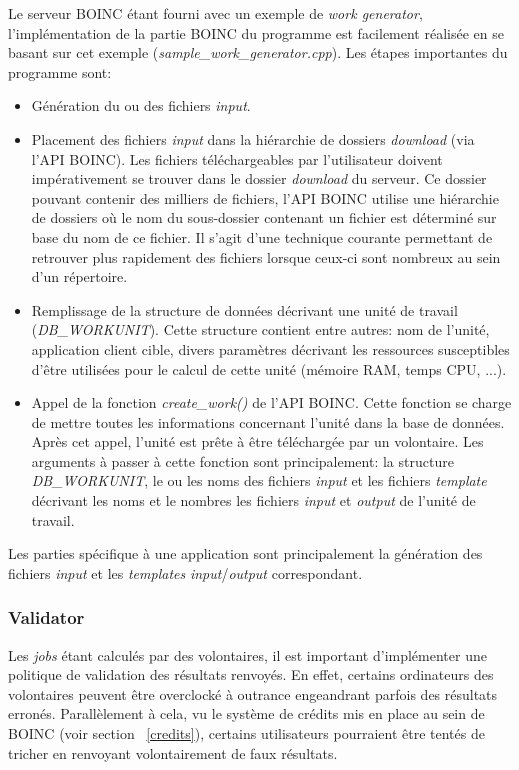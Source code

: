 \documentclass[a4paper, 11pt]{report}
\begin{document}
Le serveur \textsc{BOINC} étant fourni avec un exemple de \textit{work generator}, l'implémentation de la partie \textsc{BOINC} du programme est facilement réalisée en se basant sur cet exemple (\textit{sample\_work\_generator.cpp}). Les étapes importantes du programme sont:
\begin{itemize}
\item Génération du ou des fichiers \textit{input}.
\item Placement des fichiers \textit{input} dans la hiérarchie de dossiers \textit{download} (via l'API \textsc{BOINC}). Les fichiers téléchargeables par l'utilisateur doivent impérativement se trouver dans le dossier \textit{download} du serveur. Ce dossier pouvant contenir des milliers de fichiers, l'API \textsc{BOINC} utilise une hiérarchie de dossiers où le nom du sous-dossier contenant un fichier est déterminé sur base du nom de ce fichier. Il s'agit d'une technique courante permettant de retrouver plus rapidement des fichiers lorsque ceux-ci sont nombreux au sein d'un répertoire.
\item Remplissage de la structure de données décrivant une unité de travail (\textit{DB\_WORKUNIT}). Cette structure contient entre autres: nom de l'unité, application client cible, divers paramètres décrivant les ressources susceptibles d'être utilisées pour le calcul de cette unité (mémoire RAM, temps CPU, ...).
\item Appel de la fonction \textit{create\_work()} de l'API \textsc{BOINC}. Cette fonction se charge de mettre toutes les informations concernant l'unité dans la base de données. Après cet appel, l'unité est prête à être téléchargée par un volontaire. Les arguments à passer à cette fonction sont principalement: la structure \textit{DB\_WORKUNIT}, le ou les noms des fichiers \textit{input} et les fichiers \textit{template} décrivant les noms et le nombres les fichiers \textit{input} et \textit{output} de l'unité de travail. %
\end{itemize}

Les parties spécifique à une application sont principalement la génération des fichiers \textit{input} et les \textit{templates} \textit{input}/\textit{output} correspondant.

\subsubsection{Validator}
Les \textit{jobs} étant calculés par des volontaires, il est important d'implémenter une politique de validation des résultats renvoyés. En effet, certains ordinateurs des volontaires peuvent être overclocké à outrance engeandrant parfois des résultats erronés. Parallèlement à cela, vu le système de crédits mis en place au sein de \textsc{BOINC} (voir section ~\ref{credits}), certains utilisateurs pourraient être tentés de tricher en renvoyant volontairement de faux résultats. 
\end{document}
